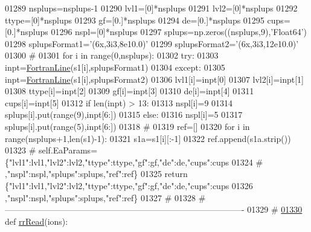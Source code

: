 \begin{DoxyCode}
{{{{{{{{{{{{01289         nsplups=nsplups-1
01290         lvl1=[0]*nsplups
01291         lvl2=[0]*nsplups
01292         ttype=[0]*nsplups
01293         gf=[0.]*nsplups
01294         de=[0.]*nsplups
01295         cups=[0.]*nsplups
01296         nspl=[0]*nsplups
01297         splups=np.zeros((nsplups,9),\textcolor{stringliteral}{'Float64'})
01298         splupsFormat1=\textcolor{stringliteral}{'(6x,3i3,8e10.0)'}
01299         splupsFormat2=\textcolor{stringliteral}{'(6x,3i3,12e10.0)'}
01300         \textcolor{comment}{#}
01301         \textcolor{keywordflow}{for} i \textcolor{keywordflow}{in} range(0,nsplups):
01302             \textcolor{keywordflow}{try}:
01303                 inpt=\hyperlink{classpyneb_1_1utils_1_1_fortran_format_1_1_fortran_line}{FortranLine}(s1[i],splupsFormat1)
01304             \textcolor{keywordflow}{except}:
01305                 inpt=\hyperlink{classpyneb_1_1utils_1_1_fortran_format_1_1_fortran_line}{FortranLine}(s1[i],splupsFormat2)
01306             lvl1[i]=inpt[0]
01307             lvl2[i]=inpt[1]
01308             ttype[i]=inpt[2]
01309             gf[i]=inpt[3]
01310             de[i]=inpt[4]
01311             cups[i]=inpt[5]
01312             \textcolor{keywordflow}{if} len(inpt)  > 13:
01313                 nspl[i]=9
01314                 splups[i].put(range(9),inpt[6:])
01315             \textcolor{keywordflow}{else}:
01316                 nspl[i]=5
01317                 splups[i].put(range(5),inpt[6:])
01318         \textcolor{comment}{#}
01319         ref=[]
01320         \textcolor{keywordflow}{for} i \textcolor{keywordflow}{in} range(nsplups+1,len(s1)-1):
01321             s1a=s1[i][:-1]
01322             ref.append(s1a.strip())
01323 \textcolor{comment}{#        self.EaParams=\{"lvl1":lvl1,"lvl2":lvl2,"ttype":ttype,"gf":gf,"de":de,"cups":cups}
01324 \textcolor{comment}{#                ,"nspl":nspl,"splups":splups,"ref":ref\}}
01325         \textcolor{keywordflow}{return} \{\textcolor{stringliteral}{"lvl1"}:lvl1,\textcolor{stringliteral}{"lvl2"}:lvl2,\textcolor{stringliteral}{"ttype"}:ttype,\textcolor{stringliteral}{"gf"}:gf,\textcolor{stringliteral}{"de"}:de,\textcolor{stringliteral}{"cups"}:cups
01326                 ,\textcolor{stringliteral}{"nspl"}:nspl,\textcolor{stringliteral}{"splups"}:splups,\textcolor{stringliteral}{"ref"}:ref\}
01327     \textcolor{comment}{#}
01328     \textcolor{comment}{# -------------------------------------------------------------------------------------}
01329     \textcolor{comment}{#}
\hypertarget{__chianti__tools_8py_source_l01330}{}\hyperlink{namespacepyneb_1_1utils_1_1__chianti__tools_a71865c846f3d3b1c9b1371c6779c8f3e}{01330} \textcolor{keyword}{def }\hyperlink{namespacepyneb_1_1utils_1_1__chianti__tools_a71865c846f3d3b1c9b1371c6779c8f3e}{rrRead}(ions):
}}}}}}}}}}}}
\end{DoxyCode}

